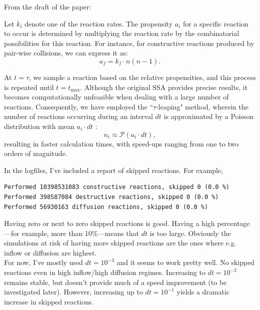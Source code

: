 \documentclass[11pt]{article}
\begin{document}
From the draft of the paper:\\

\itshape

Let $k_i$ denote one of the reaction rates. The propensity $a_i$ for a specific reaction to occur is determined by multiplying the reaction rate by the combinatorial possibilities for this reaction. For instance, for constructive reactions produced by pair-wise collisions, we can express it as:
\begin{equation}
a_f = k_f \cdot n(n-1).
\end{equation}

At $t=\tau$, we sample a reaction based on the relative propensities, and this process is repeated until $t = t_\text{max}$. Although the original SSA provides precise results, it becomes computationally unfeasible when dealing with a large number of reactions. Consequently, we have employed the ``$\tau$-leaping" method, wherein the number of reactions occurring during an interval $dt$ is approximated by a Poisson distribution with mean $a_i \cdot dt$ {\cite{gillespie_approximate_2001}}:
\begin{equation}
n_i \approx \mathcal{P}(a_i \cdot dt),
\end{equation}
resulting in faster calculation times, with speed-ups ranging from one to two orders of magnitude.\\

\normalfont

In the logfiles, I’ve included a report of skipped reactions. For example,\\

\begin{tcolorbox}[colback=LightGray!20, colframe=gray!50, boxrule=0.5pt, arc=2pt, left=5pt, right=5pt, top=5pt, bottom=5pt]
\begin{Verbatim}[fontsize=\small]
Performed 10398531083 constructive reactions, skipped 0 (0.0 %)
Performed 398587084 destructive reactions, skipped 0 (0.0 %)
Performed 56930163 diffusion reactions, skipped 0 (0.0 %)
\end{Verbatim}
\end{tcolorbox}

Having zero or next to zero skipped reactions is good. Having a high percentage---for example, more than 10\%---means that $dt$ is too large. Obviously the simulations at risk of having more skipped reactions are the ones where e.g. inflow or diffusion are highest.\\

For now, I’ve mostly used $dt=10^{-3}$ and it seems to work pretty well. No skipped reactions even in high inflow/high diffusion regimes. Increasing to $dt=10^{-2}$ remains stable, but doesn’t provide much of a speed improvement (to be investigated later). However, increasing up to $dt=10^{-1}$ yields a dramatic increase in skipped reactions.
\end{document}
